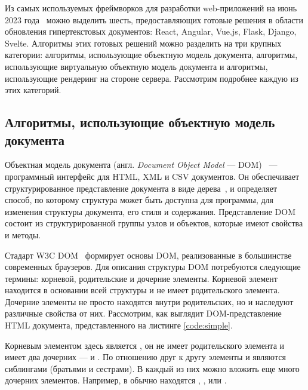 Из самых используемых фреймворков для разработки web-приложений на июнь 2023 года~\cite{web-frameworks-statistics} можно выделить шесть, предоставляющих готовые решения в области обновления гипертекстовых документов: React, Angular, Vue.js, Flask, Django, Svelte. 
Алгоритмы этих готовых решений можно разделить на три крупных категории: алгоритмы, использующие объектную модель документа, алгоритмы, использующие виртуальную объектную модель документа и алгоритмы, использующие рендеринг на стороне сервера. 
Рассмотрим подробнее каждую из этих категорий.

\subsection{Алгоритмы, использующие объектную модель  документа}

Объектная модель документа (англ. \textit{Document Object Model} --- DOM)~\cite{dom} --- программный интерфейс для HTML, XML и CSV документов.
Он обеспечивает структурированное представление документа в виде дерева~\cite{balanced-tree}, и определяет способ, по которому структура может быть доступна для программы, для изменения структуры документа, его стиля и содержания.
Представление DOM состоит из структурированной группы узлов и объектов, которые имеют свойства и методы.

Стадарт W3C DOM~\cite{dom-doc} формирует основы DOM, реализованные в большинстве современных браузеров.
Для описания структуры DOM потребуются следующие термины: корневой, родительские и дочерние элементы.
Корневой элемент находится в основании всей структуры и не имеет родительского элемента.
Дочерние элементы не просто находятся внутри родительских, но и наследуют различные свойства от них.
Рассмотрим, как выглядит DOM-представление HTML документа, представленного на листинге \ref{code:simple}.
\clearpage


Корневым элементом здесь является , он не имеет родительского элемента и имеет два дочерних ---  и . По отношению друг к другу элементы  и  являются сиблингами (братьями и сестрами). В каждый из них можно вложить еще много дочерних элементов. Например, в  обычно находятся , ,  или .

